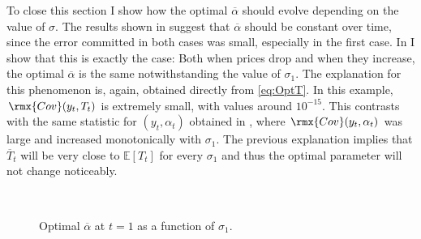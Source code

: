 \documentclass[english, a4paper,12pt]{article}
\begin{document}
To close this section I show how the optimal $\overline{\alpha}$ should evolve depending on the value of $\sigma$. The results shown in  suggest that $\overline{\alpha}$ should be constant over time, since the error committed in both cases was small, especially in the first case. In  I show that this is exactly the case: Both when prices drop and when they increase, the optimal $\overline{\alpha}$ is the same notwithstanding the value of $\sigma_{1}$. The explanation for this phenomenon is, again, obtained directly from \eqref{eq:OptT}. In this example, $\rmx{Cov}(y_{t}, T_{t})$ is extremely small, with values around $10^{-15}$. This contrasts with the same statistic for $(y_{t}, \alpha_{t})$ obtained in , where $\rmx{Cov}(y_{t}, \alpha_{t})$ was large and increased monotonically with $\sigma_{1}$. The previous explanation implies that $\overline{T}_{t}$ will be very close to $\mathbb{E}[T_{t}]$ for every $\sigma_{1}$ and thus the optimal parameter will not change noticeably.
	\begin{figure}[H] 
		\caption{Optimal $\overline{\alpha}$ at $t = 1$ as a function of $\sigma_{1}$.}
		\label{fig:CategoryAlphaPlot}
		\,
	\end{figure}
\end{document}
